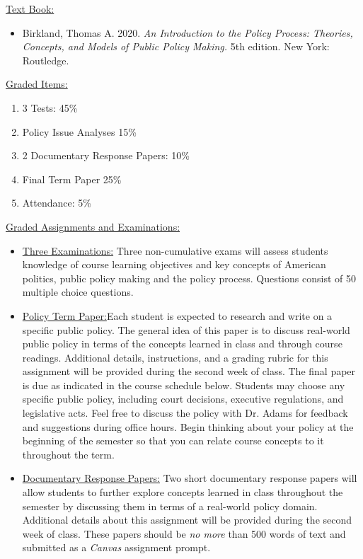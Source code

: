 \documentclass[11pt]{article}
\begin{document}
\begin{description}
\item \underline{Text Book:}
	\begin{itemize}
			\item Birkland, Thomas A. 2020. \emph{An Introduction to the Policy	Process: Theories, Concepts, and Models of Public Policy Making.} 5th edition. New York: Routledge.  
	\end{itemize}

\item \underline{Graded Items:}
	\begin{multicols}{2}
		\begin{enumerate}
			\item 3 Tests: 45\%
			\item Policy Issue Analyses 15\%
			\item 2 Documentary Response Papers: 10\%
			\item Final Term Paper 25\%
			\item Attendance: 5\%
		\end{enumerate} 
	\end{multicols}

\item \underline{Graded Assignments and Examinations:} 

\begin{itemize}
	\item \underline{Three Examinations:} Three non-cumulative exams will assess students knowledge of course learning objectives and key concepts of American politics, public policy making and the policy process. Questions consist of 50 multiple choice questions. 
	
	\item \underline{Policy Term Paper:}Each student is expected to research and write on a specific public policy. The general idea of this paper is to discuss real-world public policy in terms of the concepts learned in class and through course readings. Additional details, instructions, and a grading rubric for this assignment will be provided during the second week of class. The final paper is due as indicated in the course schedule below. Students may choose any specific public policy, including court decisions, executive regulations, and legislative acts. Feel free to discuss the policy with Dr. Adams for feedback and suggestions during office hours. Begin thinking about your policy at the beginning of the semester so that you can relate course concepts to it throughout the term.

	\item \underline{Documentary Response Papers:} Two short documentary response papers will allow students to further explore concepts learned in class throughout the semester by discussing them in terms of a real-world policy domain. Additional details about this assignment will be provided during the second week of class. These papers should be \textit{no more} than 500 words of text and submitted as a \emph{Canvas} assignment prompt. 
	

\end{itemize}
\end{description}
\end{document}

